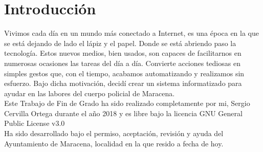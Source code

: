 \chapter{Introducción}

Vivimos cada día en un mundo más conectado a Internet, es una época en la que se está dejando de 
lado el lápiz y el papel. Donde se está abriendo paso la tecnología. Estos nuevos medios, bien
usados, son capaces de facilitarnos en numerosas ocasiones las tareas del día a día. Convierte acciones
tediosas en simples gestos que, con el tiempo, acabamos automatizando y realizamos sin esfuerzo. 
Bajo dicha motivación, decidí crear un sistema informatizado para ayudar en las labores del cuerpo policial de Maracena.\\

Este Trabajo de Fin de Grado ha sido realizado completamente por mi, Sergio 
Cervilla Ortega durante el año 2018 y es libre bajo la licencia GNU General Public License v3.0 \cite{gplv3}\\ 




Ha sido desarrollado bajo el permiso, aceptación, revisión y ayuda del Ayuntamiento de Maracena, localidad en
la que resido a fecha de hoy.\\


